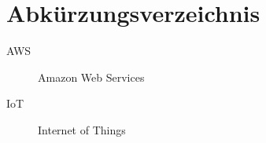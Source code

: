 
\cleardoublepage
\chapter{Abkürzungsverzeichnis}
\begin{description}
\item[AWS] Amazon Web Services
\item[IoT] Internet of Things
\end{description}
